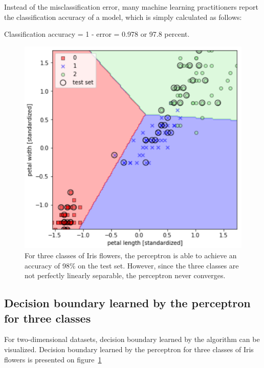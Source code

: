 \documentclass[11pt]{article}
\begin{document}
    Instead of the misclassification error, many machine learning practitioners report the classification accuracy of a model, which is simply calculated as follows:

    Classification accuracy = 1 - error = 0.978 or 97.8 percent.

    \begin{figure}[hbt!]
        \centering
        \includegraphics[width=1\linewidth,trim=4 4 4 4,clip]{img/perc_3class_dec_bound.png}
        \caption{For three classes of Iris flowers, the perceptron is able to achieve an accuracy of 98\% on the test set.
        However, since the three classes are not perfectly linearly separable, the perceptron never converges.}
        \label{fig:perc_3class_dec_bound}
    \end{figure}


    \subsection{Decision boundary learned by the perceptron for three classes} \label{subsec:perc_3class_dec_bound}

    For two-dimensional datasets, decision boundary learned by the algorithm can be visualized.
    Decision boundary learned by the perceptron for three classes of Iris flowers is presented on figure~\ref{fig:perc_3class_dec_bound}

    \medskip
    
    
\end{document}

